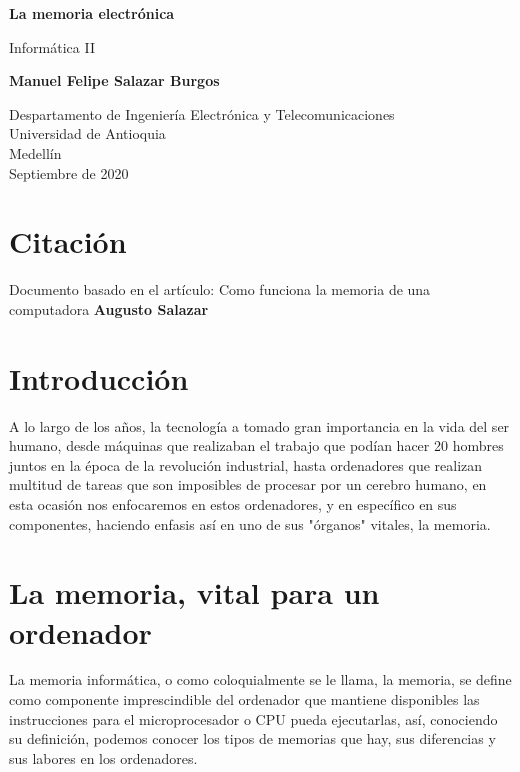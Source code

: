 \documentclass{article}
\begin{document}
\begin{titlepage}
    \begin{center}
        \vspace*{1cm}
            
        \Huge
        \textbf{La memoria electrónica}
            
        \vspace{0.5cm}
        \LARGE
        Informática II
            
        \vspace{1.5cm}
            
        \textbf{Manuel Felipe Salazar Burgos}
            
        \vfill
            
        \vspace{0.8cm}
            
        \Large
        Despartamento de Ingeniería Electrónica y Telecomunicaciones\\
        Universidad de Antioquia\\
        Medellín\\
        Septiembre de 2020
            
    \end{center}
\end{titlepage}

\tableofcontents
\newpage
\section{Citación}
Documento basado en el artículo: Como funciona la memoria de una computadora \textbf{Augusto Salazar}\cite{Salazar}
\section{Introducción}\label{intro}
A lo largo de los años, la tecnología a tomado gran importancia en la vida del ser humano, desde máquinas que realizaban el trabajo que podían hacer 20 hombres juntos en la época de la revolución industrial, hasta ordenadores que realizan multitud de tareas que son imposibles de procesar por un cerebro humano, en esta ocasión nos enfocaremos en estos ordenadores, y en específico en sus componentes, haciendo enfasis así en uno de sus "órganos" vitales, la memoria.
\section{La memoria, vital para un ordenador} \label{memory}
La memoria informática, o como coloquialmente se le llama, la memoria, se define como componente imprescindible del ordenador que mantiene disponibles las instrucciones para el microprocesador o CPU pueda ejecutarlas, así, conociendo su definición, podemos conocer los tipos de memorias que hay, sus diferencias y sus labores en los ordenadores.
\end{document}

